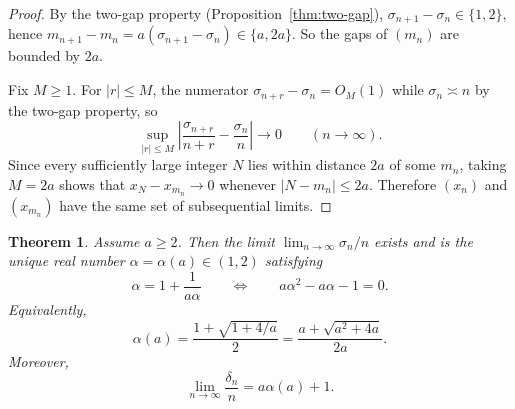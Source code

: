 \documentclass[11pt]{article}
\numberwithin{equation}{section}
\theoremstyle{plain}
\newtheorem{theorem}{Theorem}[section]
\theoremstyle{definition}
\theoremstyle{remark}
\begin{document}
\begin{proof}
By the two-gap property (Proposition~\ref{thm:two-gap}),
$\sigma_{n+1}-\sigma_n\in\{1,2\}$, hence
$m_{n+1}-m_n=a(\sigma_{n+1}-\sigma_n)\in\{a,2a\}$.
So the gaps of $(m_n)$ are bounded by $2a$.

Fix $M\ge1$.  For $|r|\le M$, the numerator $\sigma_{n+r}-\sigma_n=O_M(1)$
while $\sigma_n\asymp n$ by the two-gap property, so
\[
  \sup_{|r|\le M}\left|\frac{\sigma_{n+r}}{n+r}-\frac{\sigma_n}{n}\right|
  \longrightarrow 0
  \qquad(n\to\infty).
\]
Since every sufficiently large integer $N$ lies within distance $2a$ of some
$m_n$, taking $M=2a$ shows that $x_N-x_{m_n}\to0$ whenever $|N-m_n|\le2a$.
Therefore $(x_n)$ and $(x_{m_n})$ have the same set of subsequential limits.
\end{proof}

\begin{theorem}\label{thm:slope}
Assume $a\ge2$. Then the limit $\lim_{n\to\infty}\sigma_n/n$ exists and is
the unique real number $\alpha=\alpha(a)\in(1,2)$ satisfying
\begin{equation}\label{eq:alpha-eq}
  \alpha = 1 + \frac{1}{a\alpha}
  \qquad\Longleftrightarrow\qquad
  a\alpha^2-a\alpha-1=0.
\end{equation}
Equivalently,
\begin{equation}\label{eq:alpha-formula}
  \alpha(a)=\frac{1+\sqrt{1+4/a}}{2}
  =\frac{a+\sqrt{a^2+4a}}{2a}.
\end{equation}
Moreover,
\begin{equation}\label{eq:beta-slope}
  \lim_{n\to\infty}\frac{\delta_n}{n} = a\alpha(a)+1.
\end{equation}
\end{theorem}
\end{document}
